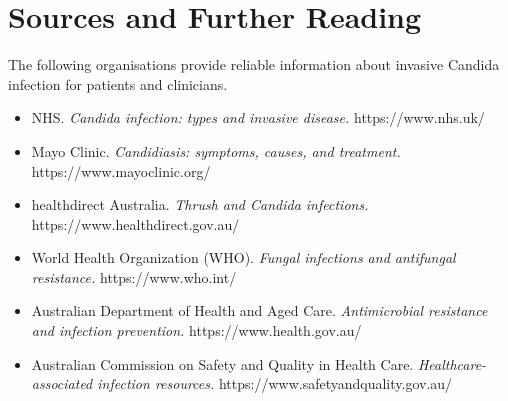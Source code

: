 \section*{Sources and Further Reading}
The following organisations provide reliable information about invasive Candida infection for patients and clinicians.

\begin{itemize}
    \item NHS. \textit{Candida infection: types and invasive disease.} https://www.nhs.uk/
    \item Mayo Clinic. \textit{Candidiasis: symptoms, causes, and treatment.} https://www.mayoclinic.org/
    \item healthdirect Australia. \textit{Thrush and Candida infections.} https://www.healthdirect.gov.au/
    \item World Health Organization (WHO). \textit{Fungal infections and antifungal resistance.} https://www.who.int/
    \item Australian Department of Health and Aged Care. \textit{Antimicrobial resistance and infection prevention.} https://www.health.gov.au/
    \item Australian Commission on Safety and Quality in Health Care. \textit{Healthcare-associated infection resources.} https://www.safetyandquality.gov.au/
\end{itemize}
\clearpage
